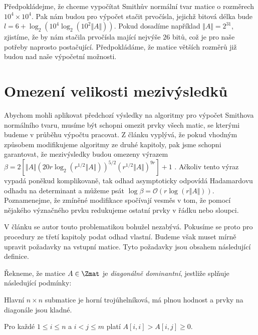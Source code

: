 Předpokládejme, že chceme vypočítat Smithův normální tvar matice o rozměrech
$ 10^4 \times 10^4 $. Pak nám budou pro výpočet stačit prvočísla, jejichž bitová
délka bude $ l = 6 + \log_2(10^4 \log_2(10^2 \Vert A \Vert)) $. Pokud dosadíme
například $ \Vert A \Vert = 2^{31} $, zjistíme, že by nám stačila prvočísla
mající nejvýše $ 26 $ bitů, což je pro naše potřeby naprosto
postačující. Předpokládáme, že matice větších rozměrů již budou nad naše výpočetní
možnosti.



\section{Omezení velikosti mezivýsledků}
Abychom mohli aplikovat předchozí výsledky na algoritmy pro výpočet Smithova
normálního tvaru, musíme být schopni omezit prvky všech matic, se kterými
budeme v průběhu výpočtu pracovat. Z článku \cite{triang} vyplývá, že pokud
vhodným způsobem modifikujeme algoritmy ze druhé kapitoly, pak jsme schopni
garantovat, že mezivýsledky budou omezeny výrazem
$ \beta = 2[\Vert A \Vert (20 r \log_2{ (r^{1/2} \Vert A \Vert) })^{5/2} (r^{1/2} \Vert A \Vert)^{9 r} ] + 1 $
\cite[Theorem 16]{triang}.
Ačkoliv tento výraz vypadá poněkud komplikovaně, tak odhad
asymptoticky odpovídá Hadamardovu odhadu na determinant a můžeme psát
$ \log{\beta} = \mathcal{O}(r \log{(r \Vert A \Vert)}) $.
Poznamenejme, že zmíněné modifikace spočívají vesměs v tom, že pomocí nějakého
význačného prvku redukujeme ostatní prvky v řádku nebo sloupci.

V článku \cite{SNF_Arne} se autor touto problematikou bohužel nezabývá. Pokusíme
se proto pro procedury ze třetí kapitoly podat odhad vlastní. Budeme však muset
mírně upravit požadavky na vstupní matice. Tyto požadavky jsou obsahem následující
definice.

\begin{defi}
    Řekneme, že matice $ A \in \Zmat $ je \emph{diagonálně dominantní}, jestliže
    splňuje následující podmínky:
    \begin{Cond}
        \item Hlavní $ n \times n $ submatice je horní trojúhelníková, má plnou
            hodnost a prvky na diagonále jsou kladné.
        \item Pro každé $ 1 \leq i \leq n $ a $ i < j \leq m $ platí $ A[i, i] > A[i, j] \geq 0 $.
    \end{Cond}
\end{defi}

